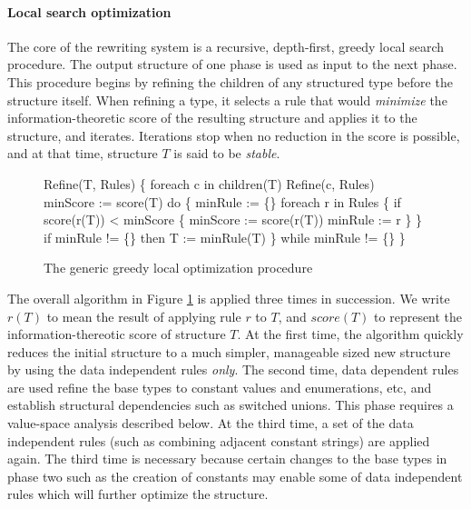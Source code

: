\paragraph*{Local search optimization}
The core of the rewriting system is 
a recursive, depth-first, greedy local search procedure. The output 
structure of one phase is used as input to the next phase.
This procedure begins by refining the children of any structured type before
the structure itself. When refining a type, it selects a rule that 
would {\em minimize} the information-theoretic score of the resulting
structure and applies it to the structure, and iterates.
Iterations stop when no reduction in the score is possible, and at
that time, structure $T$ is said to be {\em stable}.

\begin{figure}
\begin{code}
Refine(T, Rules)
\{
  foreach c in children(T)
    Refine(c, Rules)
  minScore := score(T)
  do \{
    minRule := \{\}
    foreach r in Rules 
    \{
      if score(r(T)) < minScore
      \{
        minScore := score(r(T))
        minRule := r
      \}
    \}
    if minRule != \{\} then T := minRule(T)
  \} while minRule != \{\}
\}
\end{code}
\caption{The generic greedy local optimization procedure}
\label{fig:refinement}
\end{figure}

The overall algorithm in Figure \ref{fig:refinement} is applied three
times in succession. We write $r(T)$ to mean the result of applying
rule $r$ to $T$, and $score(T)$ to represent the information-thereotic
score of structure $T$.
At the first time, the algorithm quickly reduces the initial structure to 
a much simpler, manageable sized new structure by using
the data independent rules {\em only}. The second time, data dependent
rules are used refine the base types to constant values and enumerations, etc,
and establish structural dependencies such as switched unions. This phase
requires a value-space analysis described below.
At the third time, a set of the data independent rules
(such as combining adjacent constant strings) are applied again. 
The third time is necessary because certain changes
to the base types in phase two such as the creation of constants may 
enable some of data independent rules which will further optimize the structure. 
